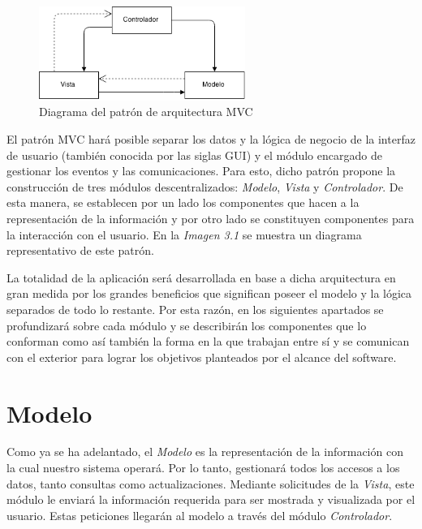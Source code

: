\documentclass{book}
\begin{document}
\begin{figure}[H]
	\centering
	\includegraphics[width=0.6\textwidth]{images/01-MVC.png}
	\medskip
	\caption{Diagrama del patrón de arquitectura MVC}
	\medskip
\end{figure}
	\bigskip
	
El patrón MVC hará posible separar los datos y la lógica de negocio de la interfaz de usuario (también conocida por las siglas GUI) y el módulo encargado de gestionar los eventos y las comunicaciones. Para esto, dicho patrón propone la construcción de tres módulos descentralizados: \textit{Modelo}, \textit{Vista} y \textit{Controlador}. De esta manera, se establecen por un lado los componentes que hacen a la representación de la información y por otro lado se constituyen componentes para la interacción con el usuario. En la \textit{Imagen 3.1} se muestra un diagrama representativo de este patrón.
\par
La totalidad de la aplicación será desarrollada en base a dicha arquitectura en gran medida por los grandes beneficios que significan poseer el modelo y la lógica separados de todo lo restante. Por esta razón, en los siguientes apartados se profundizará sobre cada módulo y se describirán los componentes que lo conforman como así también la forma en la que trabajan entre sí y se comunican con el exterior para lograr los objetivos planteados por el alcance del software.
\newpage


\section{Modelo}

Como ya se ha adelantado, el \textit{Modelo} es la representación de la información con la cual nuestro sistema operará. Por lo tanto, gestionará todos los accesos a los datos, tanto consultas como actualizaciones. Mediante solicitudes de la \textit{Vista}, este módulo le enviará la información requerida para ser mostrada y visualizada por el usuario. Estas peticiones llegarán al modelo a través del módulo \textit{Controlador}.
\bigskip
\end{document}
